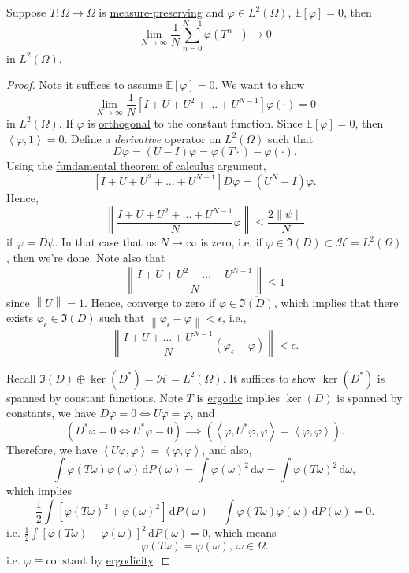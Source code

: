 \begin{proposition}
	Suppose \(T\colon \Omega \to \Omega\) is \hyperref[def:measure-preserving]{measure-preserving} and \(\varphi \in L^2(\Omega)\), \(\mathbb{E}\left[\varphi \right] = 0\), then
	\[
		\lim\limits_{N \to \infty} \frac{1}{N} \sum_{n = 0}^{N - 1} \varphi(T^n \cdot) \to 0
	\]
	in \(L^2(\Omega)\).
\end{proposition}
\begin{proof}
	Note it suffices to assume \(\mathbb{E}\left[\varphi \right] = 0\). We want to show
	\[
		\lim_{N \to \infty} \frac{1}{N} [I + U + U^2 + \dots + U^{N-1}] \varphi(\cdot) = 0
	\]
	in \(L^2(\Omega)\). If \(\varphi\) is \hyperref[def:orthogonal]{orthogonal} to the constant function. Since \(\mathbb{E}\left[\varphi \right] = 0\), then \(\left\langle \varphi, 1 \right\rangle  = 0\). Define a \emph{derivative} operator on \(L^2(\Omega)\) such that
	\[
		D \varphi = (U - I) \varphi = \varphi(T \cdot) - \varphi(\cdot).
	\]
	Using the \href{https://en.wikipedia.org/wiki/Fundamental_theorem_of_calculus}{fundamental theorem of calculus} argument,
	\[
		[I + U + U^2 + \dots + U^{N-1}] D\varphi = (U^N - I) \varphi.
	\]
	Hence,
	\[
		\left\lVert \frac{I + U + U^2 + \dots + U^{N-1}}{N} \varphi\right\rVert \leq \frac{2 \left\lVert \psi\right\rVert }{N}
	\]
	if \(\varphi = D \psi\). In that case that as \(N \to \infty\) is zero, i.e. if \(\varphi \in \Im(D) \subset \mathcal{H} = L^2(\Omega)\), then we're done. Note also that
	\[
		\left\lVert \frac{I + U + U^2 + \dots + U^{N-1}}{N}\right\rVert \leq 1
	\]
	since \(\left\lVert U\right\rVert = 1\). Hence, converge to zero if \(\varphi \in \overline{\Im(D)}\), which implies that there exists \(\varphi _\epsilon \in \Im (D)\) such that \(\left\lVert \varphi _\epsilon - \varphi \right\rVert < \epsilon \), i.e.,
	\[
		\left\lVert \frac{I + U + \dots + U^{N-1}}{N} (\varphi_\epsilon - \varphi)\right\rVert  < \epsilon.
	\]

	Recall \(\overline{\Im(D)} \oplus \ker(D^{\ast}) = \mathcal{H} = L^2(\Omega)\). It suffices to show \(\ker(D^{\ast})\) is spanned by constant functions. Note \(T\) is \hyperref[def:ergodic-transformation]{ergodic} implies \(\ker(D)\) is spanned by constants, we have \(D \varphi = 0 \Leftrightarrow U\varphi = \varphi\), and
	\[
		(D^{\ast} \varphi = 0 \Leftrightarrow U^{\ast} \varphi = 0) \implies (\left\langle \varphi, U^{\ast} \varphi, \varphi \right\rangle  = \left\langle \varphi, \varphi \right\rangle ).
	\]
	Therefore, we have \(\left\langle U \varphi, \varphi \right\rangle = \left\langle \varphi, \varphi \right\rangle\), and also,
	\[
		\int \varphi(T \omega) \varphi(\omega) \,\mathrm{d} P(\omega)
		=\int \varphi(\omega)^2 \,\mathrm{d} \omega
		= \int \varphi(T \omega)^2 \,\mathrm{d} \omega,
	\]
	which implies
	\[
		\frac{1}{2} \int [\varphi(T \omega)^2 + \varphi(\omega)^2] \,\mathrm{d} P(\omega) - \int \varphi(T \omega) \varphi(\omega) \,\mathrm{d} P(\omega) = 0.
	\]
	i.e. \(\frac{1}{2} \int[\varphi(T \omega) - \varphi(\omega)]^2 \,\mathrm{d} P(\omega) = 0\), which means
	\[
		\varphi(T \omega) = \varphi(\omega),\ \omega \in \Omega.
	\]
	i.e. \(\varphi \equiv \text{constant}\) by \hyperref[def:ergodic-transformation]{ergodicity}.
\end{proof}

